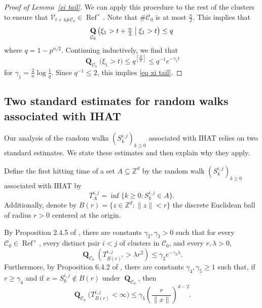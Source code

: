\documentclass[11pt,reqno]{amsart}
\theoremstyle{definition}
\numberwithin{equation}{section}
\newcommand{\Z}{\mathbb{Z}}
\newcommand{\1}{\mathbf{1}}
\DeclareMathOperator{\QQ}{\mathbf{Q}}
\DeclareMathOperator{\PPprod}{\mathbf{Q}}
\DeclareMathOperator{\Refcon}{\mathrm{Ref}}
\newcommand{\cc}{\mathsf{c}}
\newcommand{\CC}{\mathcal{C}}
\newcommand{\VV}{\mathcal{V}}
\begin{document}
\begin{proof}[Proof of Lemma~\ref{xi tail}]
We can apply this procedure to the rest of the clusters to ensure that $\VV_{t+4\#\CC_0} \in \Refcon^\times$. Note that $\# \CC_0$ is at most $\frac{n}{2}$. This implies that
\[ \PPprod_{\CC_0} \big( \xi_1 > t + \tfrac{n}{2} \bigm\vert \xi_1 > t \big) \leq q\]
where $q = 1 - p^{n/2}$. Continuing inductively, we find that
\[ \PPprod_{\CC_0} \big( \xi_1 > t \big) \leq q^{[\frac{2t}{n}]} \leq q^{-1} e^{- \gamma_1 t}  \]
for $\gamma_1 = \tfrac{2}{n} \log \tfrac{1}{q}$. Since $q^{-1} \leq 2$, this implies \eqref{eq xi tail}.
\end{proof}


\subsection{Two standard estimates for random walks associated with IHAT}\label{standard ests}

Our analysis of the random walks $(S_k^{i,j})_{k \geq 0}$ associated with IHAT relies on two standard estimates. We state these estimates and then explain why they apply.

Define the first hitting time of a set $A \subseteq \Z^d$ by the random walk $(S_k^{i,j})_{k \geq 0}$ associated with IHAT by 
\[
T^{i,j}_{A} = \inf\{k \geq 0: S_k^{i,j} \in A\}.
\]
Additionally, denote by $B(r) = \{z \in \Z^d: \|z \| < r\}$ the discrete Euclidean ball of radius $r > 0$ centered at the origin.

By Proposition 2.4.5 of \cite{lawler2010random}, there are constants $\gamma_2, \gamma_3 > 0$ such that for every $\CC_0 \in \Refcon^\times$, every distinct pair $i < j$ of clusters in $\CC_0$, and every $r, \lambda > 0$, 
\begin{equation}\label{esc time}
\QQ_{\CC_0} (T^{i,j}_{B(r)^\cc} > \lambda r^2 ) \leq \gamma_2 e^{-\gamma_3 \lambda }.
\end{equation} 
Furthermore, by Proposition 6.4.2 of \cite{lawler2010random}, there are constants $\gamma_4, \gamma_5 \geq 1$ such that, if $r \geq \gamma_4$ and if $x = S_0^{i,j} \notin B(r)$ under $\QQ_{\CC_0}$, then
\begin{equation}\label{avoid}
\QQ_{\CC_0} \big( T^{i,j}_{B(r)} < \infty \big) \leq \gamma_5 \left(\frac{r}{\|x\|}\right)^{d-2}.
\end{equation}
\end{document}
